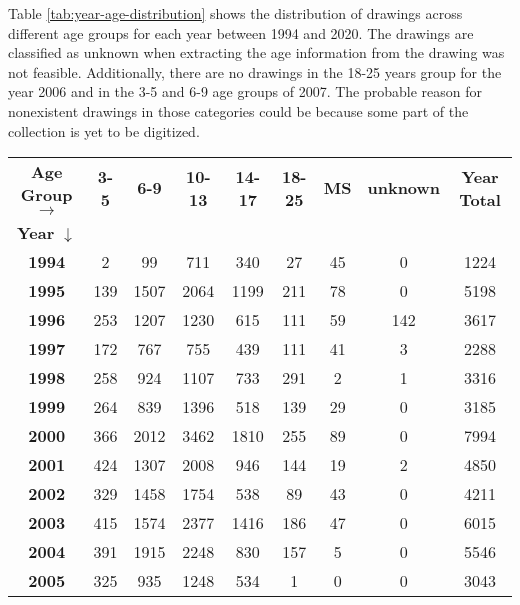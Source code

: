
Table \ref{tab:year-age-distribution} shows the distribution of drawings across different age groups for each year between 1994 and 2020. The drawings are classified as unknown when extracting the age information from the drawing was not feasible. Additionally, there are no drawings in the 18-25 years group for the year 2006 and in the 3-5 and 6-9 age groups of 2007. The probable reason for nonexistent drawings in those categories could be because some part of the collection is yet to be digitized.

\begin{table}
    \centering
    \begin{tabular}{|c|c|c|c|c|c|c|c|c|}
    \hline
        \textbf{Age Group} $\rightarrow$ & \textbf{3-5} & \textbf{6-9} & \textbf{10-13} & \textbf{14-17} & \textbf{18-25} & \textbf{MS} & \textbf{unknown} & \textbf{Year Total} \\
        \textbf{Year} $\downarrow$ &  &  &  &  &  &  &  &  \\ \hline
        \textbf{1994} & 2 & 99 & 711 & 340 & 27 & 45 & 0 & 1224 \\ \hline
        \textbf{1995} & 139 & 1507 & 2064 & 1199 & 211 & 78 & 0 & 5198 \\ \hline
        \textbf{1996} & 253 & 1207 & 1230 & 615 & 111 & 59 & 142 & 3617 \\ \hline
        \textbf{1997} & 172 & 767 & 755 & 439 & 111 & 41 & 3 & 2288 \\ \hline
        \textbf{1998} & 258 & 924 & 1107 & 733 & 291 & 2 & 1 & 3316 \\ \hline
        \textbf{1999} & 264 & 839 & 1396 & 518 & 139 & 29 & 0 & 3185 \\ \hline
        \textbf{2000} & 366 & 2012 & 3462 & 1810 & 255 & 89 & 0 & 7994 \\ \hline
        \textbf{2001} & 424 & 1307 & 2008 & 946 & 144 & 19 & 2 & 4850 \\ \hline
        \textbf{2002} & 329 & 1458 & 1754 & 538 & 89 & 43 & 0 & 4211 \\ \hline
        \textbf{2003} & 415 & 1574 & 2377 & 1416 & 186 & 47 & 0 & 6015 \\ \hline
        \textbf{2004} & 391 & 1915 & 2248 & 830 & 157 & 5 & 0 & 5546 \\ \hline
        \textbf{2005} & 325 & 935 & 1248 & 534 & 1 & 0 & 0 & 3043 \\ \hline

\end{tabular}
\end{table}
